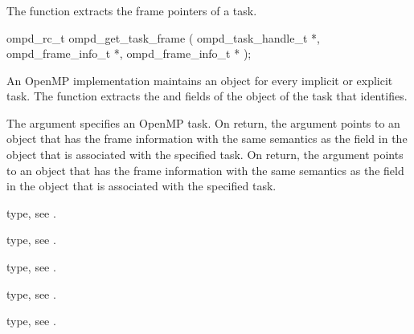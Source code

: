 \subsubsection{}
\label{subsubsubsec:ompd_get_task_frame}
\summary
The  function extracts the frame pointers of a task.

\format
\begin{cspecific}
\begin{ompSyntax}
ompd_rc_t ompd_get_task_frame (
  ompd_task_handle_t *,
  ompd_frame_info_t *,
  ompd_frame_info_t *
);
\end{ompSyntax}
\end{cspecific}

\descr
An OpenMP implementation  maintains an  object for every 
implicit or explicit task. The  function extracts 
the  and  fields of the  
object of the task that  identifies.

\argdesc
The  argument specifies an OpenMP task. On return, the 
 argument points to an  object  
that has the frame information with the same semantics as the  
field in the  object that is associated with the specified 
task. On return, the  argument points to an 
 object that has the frame information with the same 
semantics as the  field in the  object 
that is associated with the specified task. 

\begin{crossrefs}
\item {} type, see .

\item {} type, see .

\item {} type, see .

\item {} type, see .

\item {} type, see .
\end{crossrefs}



